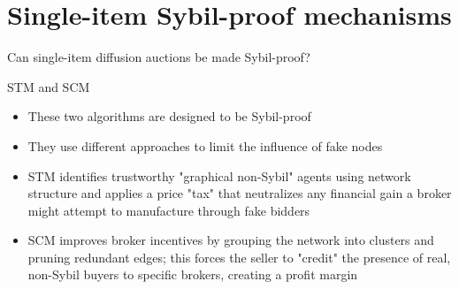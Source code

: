 \documentclass[10pt,aspectratio=169]{beamer}
\begin{document}
\section{Single-item Sybil-proof mechanisms}

\begin{frame}{Can single-item diffusion auctions be made Sybil-proof?}

\begin{block} {STM and SCM}
\begin{itemize}
    \item These two algorithms are designed to be Sybil-proof
    \item They use different approaches to limit the influence of fake nodes
    \item STM identifies trustworthy "graphical non-Sybil" agents using network structure and applies a price "tax" that neutralizes any financial gain a broker might attempt to manufacture through fake bidders
    \item SCM improves broker incentives by grouping the network into clusters and pruning redundant edges; this forces the seller to "credit" the presence of real, non-Sybil buyers to specific brokers, creating a profit margin
\end{itemize}
\end{block}

\end{frame}
\end{document}
